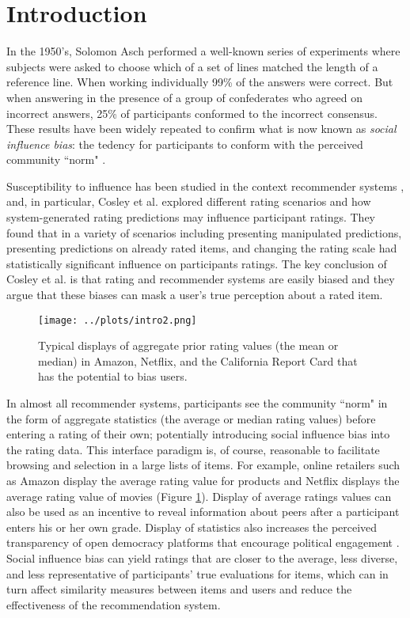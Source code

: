 \section{Introduction}

In the 1950's, Solomon Asch performed a well-known series of experiments 
\cite{asch1956studies, asch1955opinions, bond1996culture} where
subjects were asked to choose which of a set of lines matched the
length of a reference line.  
When working individually 99\% of the answers were correct.  
But when answering in the presence of a group of confederates who agreed on incorrect answers, 25\% of participants
conformed to the incorrect consensus.  
These results have been widely repeated to confirm what is now known as \emph{social influence bias}:
the tedency for participants to conform with the perceived community ``norm" \cite{demarzo2003persuasion,
moscovici1972social, wood2000attitude}.

Susceptibility to influence has been studied in the context recommender systems \cite{cosley2003seeing}, and, in particular, Cosley et al. explored
different rating scenarios and how system-generated rating predictions may influence participant ratings.
They found that in a variety of scenarios including presenting manipulated predictions, presenting predictions on already rated items, and changing the rating scale had statistically significant influence on participants ratings.
The key conclusion of Cosley et al. is that rating and recommender systems are easily biased and they argue that these biases can mask a user's true
perception about a rated item.

\begin{figure}[t]
  \centering
    \texttt{[image: ../plots/intro2.png]}
      \caption{Typical displays of aggregate prior rating values (the mean or median) in Amazon, Netflix, and the California Report Card
that has the potential to bias users.}
      \label{grading-0}
      \vspace{-1.0em}
\end{figure}

In almost all recommender systems, participants see the community ``norm" in the form of 
aggregate statistics (the average or median rating values) before entering a rating of their own;
potentially introducing social influence bias into the rating data.
This interface paradigm is, of course, reasonable to facilitate browsing and selection in a large lists of items.
For example, online retailers such as Amazon display the average rating value
for products and Netflix displays the average rating value of movies
(Figure \ref{grading-0}).  Display of average ratings values can also be
used as an incentive\cite{jian2012incentive} to reveal information about
peers after a participant enters his or her own grade.  
Display of statistics also increases the perceived transparency of open democracy platforms that encourage political engagement
\cite{albors2008new,o2012transparency,noveck2008wiki}.
Social influence bias can yield ratings that are closer to the average, less diverse, and less representative of participants' true
evaluations for items, which can in turn affect similarity measures between items and users and reduce the effectiveness of the recommendation system. 

